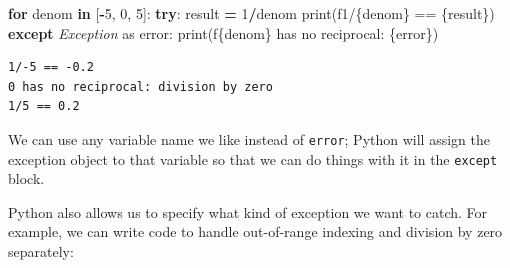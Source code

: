 \documentclass[
]{krantz}
\makeatletter
\newenvironment{Shaded}{\begin{snugshade}}{\end{snugshade}}
\newcommand{\BuiltInTok}[1]{#1}
\newcommand{\ControlFlowTok}[1]{\textcolor[rgb]{0.13,0.29,0.53}{\textbf{#1}}}
\newcommand{\DecValTok}[1]{\textcolor[rgb]{0.00,0.00,0.81}{#1}}
\newcommand{\ImportTok}[1]{#1}
\newcommand{\KeywordTok}[1]{\textcolor[rgb]{0.13,0.29,0.53}{\textbf{#1}}}
\newcommand{\NormalTok}[1]{#1}
\newcommand{\OperatorTok}[1]{\textcolor[rgb]{0.81,0.36,0.00}{\textbf{#1}}}
\newcommand{\PreprocessorTok}[1]{\textcolor[rgb]{0.56,0.35,0.01}{\textit{#1}}}
\newcommand{\SpecialCharTok}[1]{\textcolor[rgb]{0.00,0.00,0.00}{#1}}
\newcommand{\SpecialStringTok}[1]{\textcolor[rgb]{0.31,0.60,0.02}{#1}}
\newenvironment{kframe}{%
\medskip{}
\setlength{\fboxsep}{.8em}
 \def\at@end@of@kframe{}%
 \ifinner\ifhmode%
  \def\at@end@of@kframe{\end{minipage}}%
  \begin{minipage}{\columnwidth}%
 \fi\fi%
 \def\FrameCommand##1{\hskip\@totalleftmargin \hskip-\fboxsep
 \colorbox{shadecolor}{##1}\hskip-\fboxsep
     \hskip-\linewidth \hskip-\@totalleftmargin \hskip\columnwidth}%
 \MakeFramed {\advance\hsize-\width
   \@totalleftmargin\z@ \linewidth\hsize
   \@setminipage}}%
 {\par\unskip\endMakeFramed%
 \at@end@of@kframe}
\renewenvironment{Shaded}{\begin{kframe}}{\end{kframe}}
\makeatother
\begin{document}
\begin{Shaded}
\begin{Highlighting}[]
\ControlFlowTok{for}\NormalTok{ denom }\KeywordTok{in}\NormalTok{ [}\OperatorTok{{-}}\DecValTok{5}\NormalTok{, }\DecValTok{0}\NormalTok{, }\DecValTok{5}\NormalTok{]:}
    \ControlFlowTok{try}\NormalTok{:}
\NormalTok{        result }\OperatorTok{=} \DecValTok{1}\OperatorTok{/}\NormalTok{denom}
        \BuiltInTok{print}\NormalTok{(}\SpecialStringTok{f\textquotesingle{}1/}\SpecialCharTok{\{}\NormalTok{denom}\SpecialCharTok{\}}\SpecialStringTok{ == }\SpecialCharTok{\{}\NormalTok{result}\SpecialCharTok{\}}\SpecialStringTok{\textquotesingle{}}\NormalTok{)}
    \ControlFlowTok{except} \PreprocessorTok{Exception} \ImportTok{as}\NormalTok{ error:}
        \BuiltInTok{print}\NormalTok{(}\SpecialStringTok{f\textquotesingle{}}\SpecialCharTok{\{}\NormalTok{denom}\SpecialCharTok{\}}\SpecialStringTok{ has no reciprocal: }\SpecialCharTok{\{}\NormalTok{error}\SpecialCharTok{\}}\SpecialStringTok{\textquotesingle{}}\NormalTok{)}
\end{Highlighting}
\end{Shaded}

\begin{verbatim}
1/-5 == -0.2
0 has no reciprocal: division by zero
1/5 == 0.2
\end{verbatim}

We can use any variable name we like instead of \texttt{error};
Python will assign the exception object to that variable
so that we can do things with it in the \texttt{except} block.

Python also allows us to specify what kind of exception we want to catch.
For example,
we can write code to handle out-of-range indexing and division by zero separately:
\end{document}
